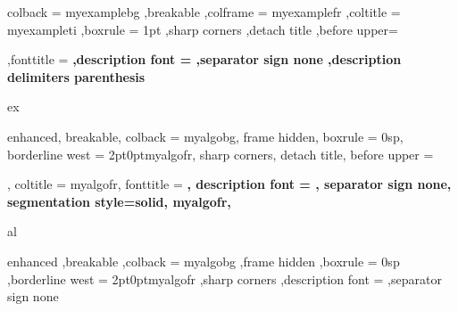 {%
	colback = myexamplebg
	,breakable
	,colframe = myexamplefr
	,coltitle = myexampleti
	,boxrule = 1pt
	,sharp corners
	,detach title
	,before upper=\tcbtitle\par\smallskip
	,fonttitle = \bfseries
	,description font = \mdseries
	,separator sign none
	,description delimiters parenthesis
}
{ex}


{%
	enhanced,
	breakable,
	colback = myalgobg,
	frame hidden,
	boxrule = 0sp,
	borderline west = {2pt}{0pt}{myalgofr},
	sharp corners,
	detach title,
	before upper = \tcbtitle\par\smallskip,
	coltitle = myalgofr,
	fonttitle = \bfseries\sffamily,
	description font = \mdseries,
	separator sign none,
	segmentation style={solid, myalgofr},
}
{al}

{%
	enhanced
	,breakable
	,colback = myalgobg
	,frame hidden
	,boxrule = 0sp
	,borderline west = {2pt}{0pt}{myalgofr}
	,sharp corners
	,description font = \mdseries
	,separator sign none
}

